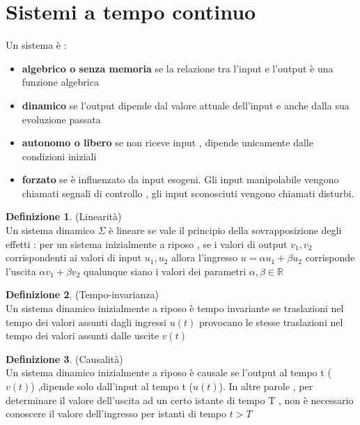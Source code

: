 \documentclass{article}
\theoremstyle{definition}
\newtheorem*{definizione}{Definizione}
\newcommand{\R}{\mathbb{R}}
\begin{document}
\section{Sistemi a tempo continuo}
\begin{center}
\end{center}
Un sistema è :
\begin{itemize}
	\item \textbf{algebrico o senza memoria} se la relazione tra l'input e l'output è una funzione algebrica
	\item \textbf{dinamico} se l'output dipende dal valore attuale dell'input e anche dalla sua evoluzione passata 
	\item \textbf{autonomo o libero} se non riceve input , dipende unicamente dalle condizioni iniziali 
	\item \textbf{forzato} se è influenzato da input esogeni. Gli input manipolabile vengono chiamati segnali di controllo , gli input sconosciuti vengono chiamati disturbi.
\end{itemize}
\begin{definizione} (Linearità)
	\\ Un sistema dinamico $\Sigma$ è lineare se vale il principio della sovrapposizione degli effetti : per un sistema inizialmente a riposo , se i valori di output $v_1 , v_2$ corrispondenti ai valori di input $u_1,u_2$ allora l'ingresso $u=\alpha u_1 + \beta u_2$ corrisponde l'uscita $\alpha v_1 + \beta v_2$ qualunque siano i valori dei parametri $\alpha , \beta \in \R$
\end{definizione}
\begin{definizione}(Tempo-invarianza)\\
	Un sistema dinamico inizialmente a riposo è tempo invariante se traslazioni nel tempo dei valori assunti dagli ingressi $u(t)$ provocano le stesse traslazioni nel tempo dei valori assunti dalle uscite $v(t)$
\end{definizione}
\begin{definizione}(Causalità)\\
	Un sistema dinamico inizialmente a riposo è causale se l'output al tempo t ($v(t)$) ,dipende solo dall'input al tempo t ($u(t)$). In altre parole , per determinare il valore dell'uscita ad un certo istante di tempo T , non è necessario conoscere il valore dell'ingresso per istanti di tempo $t > T$
\end{definizione}
\end{document}
